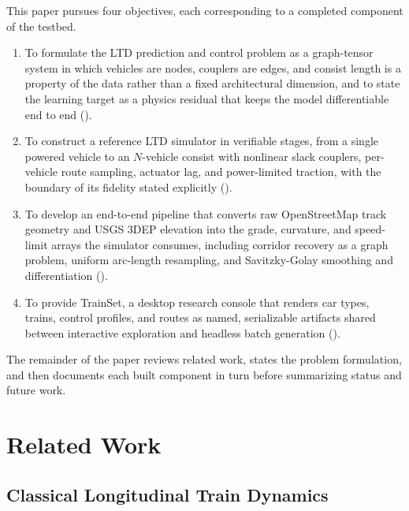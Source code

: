\documentclass[numbered]{trbunofficial}
\begin{document}
This paper pursues four objectives, each corresponding to a completed component of the testbed.

\begin{enumerate}
  \item To formulate the LTD prediction and control problem as a graph-tensor system in which vehicles are nodes, couplers are edges, and consist length is a property of the data rather than a fixed architectural dimension, and to state the learning target as a physics residual that keeps the model differentiable end to end ().
  \item To construct a reference LTD simulator in verifiable stages, from a single powered vehicle to an $N$-vehicle consist with nonlinear slack couplers, per-vehicle route sampling, actuator lag, and power-limited traction, with the boundary of its fidelity stated explicitly ().
  \item To develop an end-to-end pipeline that converts raw OpenStreetMap track geometry and USGS 3DEP elevation into the grade, curvature, and speed-limit arrays the simulator consumes, including corridor recovery as a graph problem, uniform arc-length resampling, and Savitzky-Golay smoothing and differentiation ().
  \item To provide TrainSet, a desktop research console that renders car types, trains, control profiles, and routes as named, serializable artifacts shared between interactive exploration and headless batch generation ().
\end{enumerate}

The remainder of the paper reviews related work, states the problem formulation, and then documents each built component in turn before summarizing status and future work.

\section{Related Work}\label{sec:related}

\subsection{Classical Longitudinal Train Dynamics}
\end{document}
